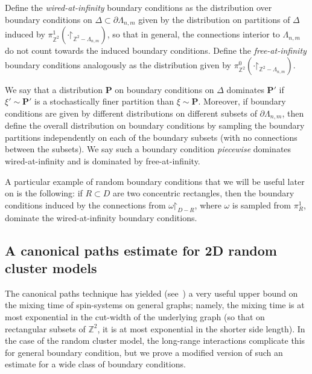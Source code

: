 \documentclass[reqno,11pt]{amsart}
\numberwithin{equation}{section}
\renewcommand{\restriction}{\mathord{\upharpoonright}}
\theoremstyle{definition}{
\newtheorem{example}[theorem]{Example}
\newtheorem{definition}[theorem]{Definition}
\newtheorem*{definition*}{Definition}
\newtheorem{problem}[theorem]{Problem}
\newtheorem{question}[theorem]{Question}
\newtheorem{remark}[theorem]{Remark}
}
\begin{document}
\begin{definition} \label{def:boundary-condition} Define the \emph{wired-at-infinity} boundary conditions as the distribution over boundary conditions on $\Delta\subset \partial \Lambda_{n,m}$ given by the distribution on partitions of $\Delta$ induced by $\pi^{1}_{\mathbb Z^2}(\cdot \restriction_{\mathbb Z^2-\Lambda_{n,m}})$, so that in general, the connections interior to $\Lambda_{n,m}$ do not count towards the induced boundary conditions. Define the \emph{free-at-infinity} boundary conditions analogously as the distribution given by $\pi_{\mathbb Z^2}^{0}(\cdot \restriction_{\mathbb Z^2 - \Lambda_{n,m}})$.

We say that a distribution $\mathbf P$ on boundary conditions on $\Delta$ dominates $\mathbf P'$ if $\xi'\sim \mathbf P'$ is a stochastically finer partition than $\xi\sim\mathbf P$. Moreover, if boundary conditions are given by different distributions on different subsets of $\partial \Lambda_{n,m}$, then define the overall distribution on boundary conditions by sampling the boundary partitions independently on each of the boundary subsets (with no connections between the subsets). We say such a boundary condition \emph{piecewise} dominates wired-at-infinity and is dominated by free-at-infinity.
\end{definition}

A particular example of random boundary conditions that we will be useful later on  is the following: if $R\subset D$ are two concentric rectangles, then the boundary conditions induced by the connections from $\omega\restriction_{D-R}$, where $\omega$ is sampled from $\pi^{1}_{R}$, dominate the wired-at-infinity boundary conditions. 

\subsection{A canonical paths estimate for 2D random cluster models}

The canonical paths technique has yielded (see~\cite{DiSa93,DiSt91,JeSi89,Sinclair92}) a very useful upper bound on the mixing time of spin-systems on general graphs; namely, the mixing time is at most exponential in the cut-width of the underlying graph (so that on rectangular subsets of $\mathbb Z^2$, it is at most exponential in the shorter side length). In the case of the random cluster model, the long-range interactions complicate this for general boundary condition, but we prove a modified version of such an estimate for a wide class of boundary conditions. 
\end{document}

